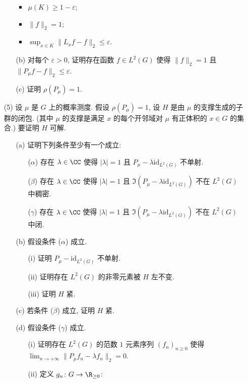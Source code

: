 \begin{enumerate}
\begin{enumerate}
\begin{itemize}
    \item $\mu(K) \geq 1 - \varepsilon$;
    \item $\|f\|_2 = 1$;
    \item $\sup_{x \in K}\|L_xf - f\|_2 \leq \varepsilon$.
    \end{itemize}
  \item[(b)] 对每个 $\varepsilon > 0$, 证明存在函数 $f \in L^2(G)$ 使得 $\|f\|_2 = 1$ 且 $\|P_{\mu}f - f\|_2 \leq \varepsilon$.
  \item[(c)] 证明 $\rho(P_{\mu}) = 1$.
  \end{enumerate}
\item[(5)] 设 $\mu$ 是 $G$ 上的概率测度. 假设 $\rho(P_{\mu}) = 1$, 设 $H$ 是由 $\mu$ 的支撑生成的子群的闭包. (其中 $\mu$ 的支撑是满足 $x$ 的每个开邻域对 $\mu$ 有正体积的 $x \in G$ 的集合.) 要证明 $H$ 可解.
  \begin{enumerate}
  \item[(a)] 证明下列条件至少有一个成立:
    \begin{enumerate}
    \item[($\alpha$)] 存在 $\lambda \in \CC$ 使得 $|\lambda| = 1$ 且 $P_{\mu} - \lambda\mathrm{id}_{L^2(G)}$ 不单射.
    \item[($\beta$)] 存在 $\lambda \in \CC$ 使得 $|\lambda| = 1$ 且 $\Im(P_{\mu} - \lambda\mathrm{id}_{L^2(G)})$ 不在 $L^2(G)$ 中稠密.
    \item[($\gamma$)] 存在 $\lambda \in \CC$ 使得 $|\lambda| = 1$ 且 $\Im(P_{\mu} - \lambda\mathrm{id}_{L^2(G)})$ 不在 $L^2(G)$ 中闭.
    \end{enumerate}
  \item[(b)] 假设条件 ($\alpha$) 成立.
    \begin{enumerate}
    \item[(i)] 证明 $P_{\mu} - \mathrm{id}_{L^2(G)}$ 不单射.
    \item[(ii)] 证明存在 $L^2(G)$ 的非零元素被 $H$ 左不变.
    \item[(iii)] 证明 $H$ 紧.
    \end{enumerate}
  \item[(c)] 若条件 ($\beta$) 成立, 证明 $H$ 紧.
  \item[(d)] 假设条件 ($\gamma$) 成立.
    \begin{enumerate}
    \item[(i)] 证明存在 $L^2(G)$ 的范数 $1$ 元素序列 $(f_n)_{n \geq 0}$ 使得 $\lim_{n \to +\infty}\|P_{\mu}f_n - \lambda f_n\|_2 = 0$.
    \item[(ii)] 定义 $g_n \colon G \to \R_{\geq 0}$:
      \[
\]
\end{enumerate}
\end{enumerate}
\end{enumerate}
